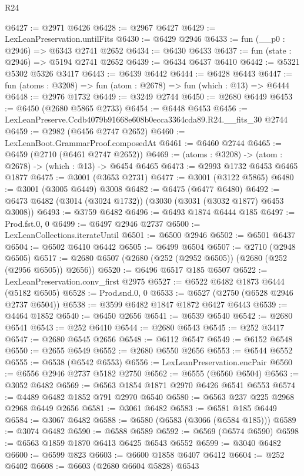 \begin{lexlean}{R24}
\begin{coremodule}
@6427 := @2971 @6426
@6428 := @2967 @6427
@6429 := LexLeanPreservation.untilFits
@6430 := @6429 @2946
@6433 := fun (__p0 : @2946) => @6343 @2741 @2652
@6434 := @6430 @6433
@6437 := fun (state : @2946) => @5194 @2741 @2652
@6439 := @6434 @6437 @6410
@6442 := @5321 @5302 @5326 @3417
@6443 := @6439 @6442
@6444 := @6428 @6443
@6447 := fun (atoms : @3208) => fun (atom : @2678) => fun (which : @13) => @6444
@6448 := @2976 @1732
@6449 := @3249 @2744
@6450 := @2680 @6449
@6453 := @6450 (@2680 @5865 @2733)
@6454 := @6448 @6453
@6456 := LexLeanPreserve.Ccdb4079b91668e608b0ecca3364cda89.R24.__fits_30 @2744
@6459 := @2982 (@6456 @2747 @2652)
@6460 := LexLeanBoot.GrammarProof.composedAt
@6461 := @6460 @2744
@6465 := @6459 (@2710 (@6461 @2747 @2652))
@6469 := (atoms : @3208) -> (atom : @2678) -> (which : @13) -> @6454 @6465
@6473 := @2993 @1732 @6453 @6465 @1877
@6475 := @3001 (@3653 @2731)
@6477 := @3001 (@3122 @5865)
@6480 := @3001 (@3005 @6449) @3008
@6482 := @6475 (@6477 @6480)
@6492 := @6473 @6482 (@3014 (@3024 @1732)) (@3030 (@3031 (@3032 @1877) @6453 @3008))
@6493 := @3759 @6482
@6496 := @6493 @1874 @6444 @185
@6497 := Prod.fst.{0, 0}
@6499 := @6497 @2946 @2737
@6500 := LexLeanCollections.iterateUntil
@6501 := @6500 @2946
@6502 := @6501 @6437
@6504 := @6502 @6410 @6442
@6505 := @6499 @6504
@6507 := @2710 (@2948 @6505)
@6517 := @2680 @6507 (@2680 (@252 (@2952 @6505)) (@2680 (@252 (@2956 @6505)) @2656))
@6520 := @6496 @6517 @185 @6507
@6522 := LexLeanPreservation.conv_first @2975
@6527 := @6522 @6482 @1873 @6444 (@5182 @6505)
@6528 := Prod.snd.{0, 0}
@6533 := @6527 (@2750 (@6528 @2946 @2737 @6504))
@6538 := @3599 @6482 @1847 @1872 @6427 @6443
@6539 := @4464 @1852
@6540 := @6450 @2656
@6541 := @6539 @6540
@6542 := @2680 @6541
@6543 := @252 @6410
@6544 := @2680 @6543
@6545 := @252 @3417
@6547 := @2680 @6545 @2656
@6548 := @6112 @6547
@6549 := @6152 @6548
@6550 := @2655 @6549
@6552 := @2680 @6550 @2656
@6553 := @6544 @6552
@6555 := @6538 (@6542 @6553)
@6556 := LexLeanPreservation.encPair
@6560 := @6556 @2946 @2737 @5182 @2750
@6562 := @6555 (@6560 @6504)
@6563 := @3052 @6482
@6569 := @6563 @1854 @1871 @2970 @6426 @6541 @6553
@6574 := @4489 @6482 @1852 @791 @2970 @6540
@6580 := @6563 @237 @225 @2968 @2968 @6449 @2656
@6581 := @3061 @6482
@6583 := @6581 @185 @6449
@6584 := @3067 @6482
@6588 := @6580 (@6583 (@3066 (@6584 @185)))
@6589 := @3074 @6482
@6590 := @6588 @6589
@6592 := @6569 (@6574 @6590)
@6598 := @6563 @1859 @1870 @6413 @6425 @6543 @6552
@6599 := @3040 @6482
@6600 := @6599 @823
@6603 := @6600 @1858 @6407 @6412
@6604 := @252 @6402
@6608 := @6603 (@2680 @6604 @5828) @6543

\end{coremodule}
\end{lexlean}
